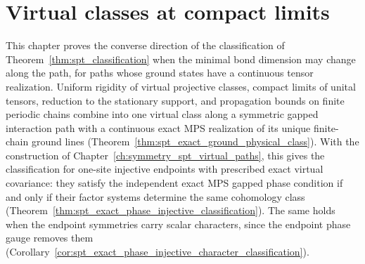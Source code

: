 \chapter{Virtual classes at compact limits}
\label{ch:symmetry_spt_compact_limits}

This chapter proves the converse direction of the classification of
Theorem~\ref{thm:spt_classification} when the minimal bond dimension may change
along the path, for paths whose ground states have a continuous tensor
realization. Uniform rigidity of virtual projective classes, compact limits
of unital tensors, reduction to the stationary support, and propagation bounds
on finite periodic chains combine into one virtual class along a symmetric
gapped interaction path with a continuous exact MPS realization of its unique
finite-chain ground lines (Theorem~\ref{thm:spt_exact_ground_physical_class}).
With the construction of Chapter~\ref{ch:symmetry_spt_virtual_paths}, this
gives the classification for one-site injective endpoints with prescribed
exact virtual covariance: they satisfy the independent exact MPS gapped phase
condition if and only if their factor systems determine the same cohomology
class (Theorem~\ref{thm:spt_exact_phase_injective_classification}). The same
holds when the endpoint symmetries carry scalar characters, since the endpoint
phase gauge removes them
(Corollary~\ref{cor:spt_exact_phase_injective_character_classification}).


